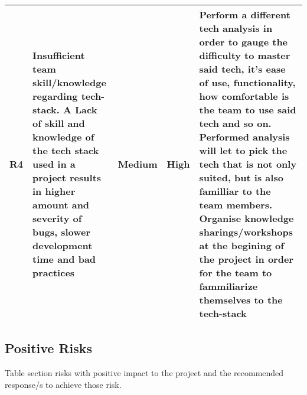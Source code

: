 \documentclass{VUMIFPSkursinis}
\begin{document}
\begin{center}
\begin{longtable}{|C{1cm}|L{4.55cm}|C{2cm}|C{2cm}|L{4.55cm}|}
		R4 &
		\textbf{Insufficient team skill/knowledge regarding tech-stack}. A Lack of skill and knowledge of the tech stack used in a project results in higher amount and severity of bugs, slower development time and bad practices&
		Medium&
		High&
		Perform a different tech analysis in order to gauge the difficulty to master said tech, it's ease of use, functionality, how comfortable is the team to use said tech and so on. Performed analysis will let to pick the tech that is not only suited, but is also familliar to the team members.
		Organise knowledge sharings/workshops at the begining of the project in order for the team to fammiliarize themselves to the tech-stack\\ \hline					
	\end{longtable}
\end{center}

\subsection{Positive Risks}
Table section risks with positive impact to the project and the recommended response/s to achieve those risk.
\end{document}
